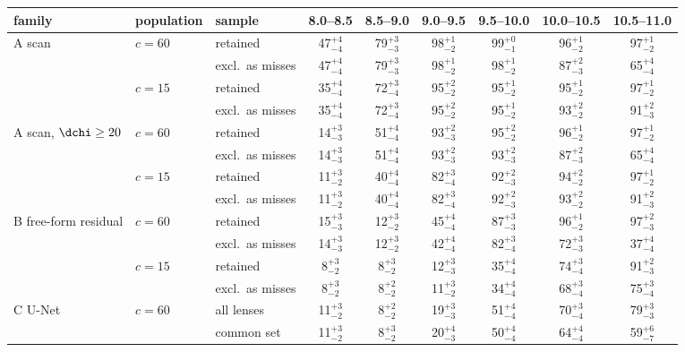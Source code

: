 \begin{tabular}{@{}lllcccccc@{}}
\toprule
family & population & sample & 8.0--8.5 & 8.5--9.0 & 9.0--9.5 & 9.5--10.0 & 10.0--10.5 & 10.5--11.0 \\
\midrule
A scan & $c{=}60$ & retained & 47$^{+4}_{-4}$ & 79$^{+3}_{-3}$ & 98$^{+1}_{-2}$ & 99$^{+0}_{-1}$ & 96$^{+1}_{-2}$ & 97$^{+1}_{-2}$ \\
 &  & excl.\ as misses & 47$^{+4}_{-4}$ & 79$^{+3}_{-3}$ & 98$^{+1}_{-2}$ & 98$^{+1}_{-2}$ & 87$^{+2}_{-3}$ & 65$^{+4}_{-4}$ \\
 & $c{=}15$ & retained & 35$^{+4}_{-4}$ & 72$^{+3}_{-4}$ & 95$^{+2}_{-2}$ & 95$^{+1}_{-2}$ & 95$^{+1}_{-2}$ & 97$^{+1}_{-2}$ \\
 &  & excl.\ as misses & 35$^{+4}_{-4}$ & 72$^{+3}_{-4}$ & 95$^{+2}_{-2}$ & 95$^{+1}_{-2}$ & 93$^{+2}_{-2}$ & 91$^{+2}_{-3}$ \\
\addlinespace[2pt]
A scan, $\dchi\ge20$ & $c{=}60$ & retained & 14$^{+3}_{-3}$ & 51$^{+4}_{-4}$ & 93$^{+2}_{-3}$ & 95$^{+2}_{-2}$ & 96$^{+1}_{-2}$ & 97$^{+1}_{-2}$ \\
 &  & excl.\ as misses & 14$^{+3}_{-3}$ & 51$^{+4}_{-4}$ & 93$^{+2}_{-3}$ & 93$^{+2}_{-3}$ & 87$^{+2}_{-3}$ & 65$^{+4}_{-4}$ \\
 & $c{=}15$ & retained & 11$^{+3}_{-2}$ & 40$^{+4}_{-4}$ & 82$^{+3}_{-4}$ & 92$^{+2}_{-3}$ & 94$^{+2}_{-2}$ & 97$^{+1}_{-2}$ \\
 &  & excl.\ as misses & 11$^{+3}_{-2}$ & 40$^{+4}_{-4}$ & 82$^{+3}_{-4}$ & 92$^{+2}_{-3}$ & 93$^{+2}_{-2}$ & 91$^{+2}_{-3}$ \\
\addlinespace[2pt]
B free-form residual & $c{=}60$ & retained & 15$^{+3}_{-3}$ & 12$^{+3}_{-2}$ & 45$^{+4}_{-4}$ & 87$^{+3}_{-3}$ & 96$^{+1}_{-2}$ & 97$^{+2}_{-3}$ \\
 &  & excl.\ as misses & 14$^{+3}_{-3}$ & 12$^{+3}_{-2}$ & 42$^{+4}_{-4}$ & 82$^{+3}_{-4}$ & 72$^{+3}_{-3}$ & 37$^{+4}_{-4}$ \\
 & $c{=}15$ & retained & 8$^{+3}_{-2}$ & 8$^{+3}_{-2}$ & 12$^{+3}_{-3}$ & 35$^{+4}_{-4}$ & 74$^{+3}_{-4}$ & 91$^{+2}_{-3}$ \\
 &  & excl.\ as misses & 8$^{+3}_{-2}$ & 8$^{+2}_{-2}$ & 11$^{+3}_{-2}$ & 34$^{+4}_{-4}$ & 68$^{+3}_{-4}$ & 75$^{+3}_{-4}$ \\
\addlinespace[2pt]
C U-Net & $c{=}60$ & all lenses & 11$^{+3}_{-2}$ & 8$^{+2}_{-2}$ & 19$^{+3}_{-3}$ & 51$^{+4}_{-4}$ & 70$^{+3}_{-4}$ & 79$^{+3}_{-3}$ \\
 &  & common set & 11$^{+3}_{-2}$ & 8$^{+3}_{-2}$ & 20$^{+4}_{-3}$ & 50$^{+4}_{-4}$ & 64$^{+4}_{-4}$ & 59$^{+6}_{-7}$ \\

\end{tabular}
